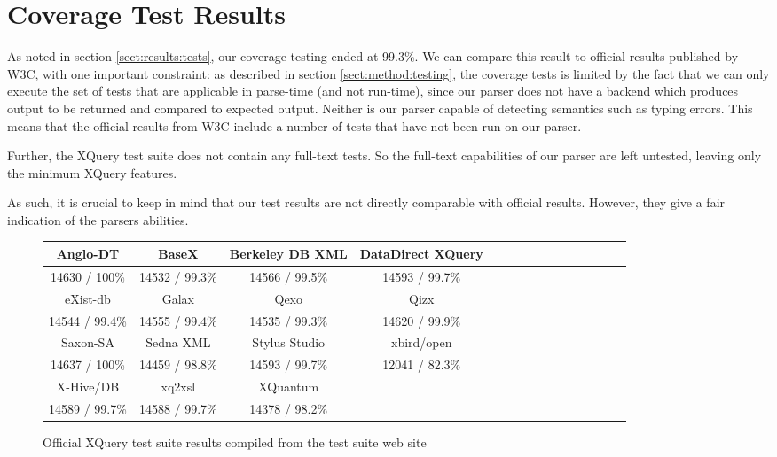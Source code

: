 \section{Coverage Test Results}
\label{sect:discussion:coverageResults}
As noted in section \ref{sect:results:tests}, our coverage testing ended at 
99.3\%. We can compare this result to official results published by W3C, with one
important constraint: as described in section \ref{sect:method:testing}, the
coverage tests is limited by the fact that we can only execute the set of tests
that are applicable in parse-time (and not run-time), since our parser does not
have a backend which produces output to be returned and compared to expected
output. Neither is our parser capable of detecting semantics such as
typing errors. This means that the official results from W3C include a number
of tests that have not been run on our parser.

Further, the XQuery test suite does not contain any full-text tests. So the
full-text capabilities of our parser are left untested, leaving only the minimum
XQuery features.

As such, it is crucial to keep in mind that our test results are not directly
comparable with official results. However, they give a fair indication of the
parsers abilities. 

\begin{figure}[h!]
  \begin{center}
    \begin{tabular}{ |c | c | c | c | c | c | c | c | c | c | c | c | c | c | c | }
      \hline
      Anglo-DT        & BaseX           & Berkeley DB XML   & DataDirect XQuery \\ \hline
      14630 / 100\%   & 14532 / 99.3\%  & 14566 / 99.5\%    & 14593 / 99.7\%  \\ \hline \hline
      eXist-db        & Galax           & Qexo              & Qizx \\ \hline            
      14544 / 99.4\%  & 14555 / 99.4\%  & 14535 / 99.3\%    & 14620 / 99.9\% \\ \hline \hline
      Saxon-SA        & Sedna XML       & Stylus Studio     & xbird/open \\ \hline
      14637 / 100\%   & 14459 / 98.8\%  & 14593 / 99.7\%    & 12041 / 82.3\% \\ \hline \hline
      X-Hive/DB       & xq2xsl          & XQuantum          & \\ \hline
      14589 / 99.7\%   & 14588 / 99.7\%  & 14378 / 98.2\%    & \\ 
    \hline
    \end{tabular}
  \end{center}
  \caption[Official XQuery test suite results]{Official XQuery test suite
  results compiled from the test suite web site\cite{w3ctestresults}} 
  \label{figure:table:w3c_test_results}
\end{figure}

